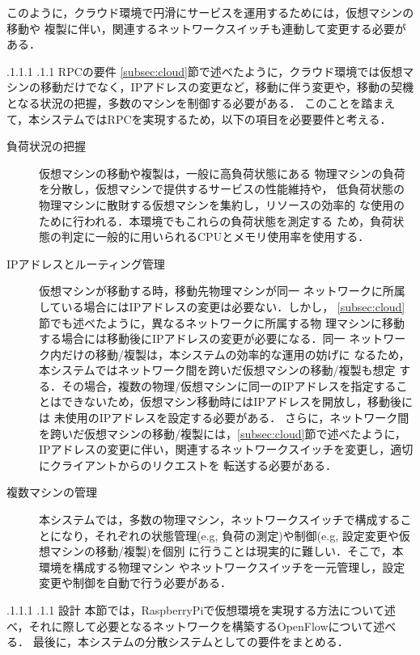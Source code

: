 \documentclass[a4paper, twocolumn]{jarticle}
\makeatletter
\def\section{\@startsection{section}{1}{\z@}%
 {.1\Cvs \@plus.1\Cdp \@minus.1\Cdp}%
 {.1\Cvs \@plus.1\Cdp}%
 {\normalfont\normalsize\bfseries}}
\def\subsection{\@startsection{subsection}{1}{\z@}%
 {.1\Cvs \@plus.1\Cdp \@minus.1\Cdp}%
 {.1\Cvs \@plus.1\Cdp}%
 {\normalfont\normalsize\bfseries}}
\makeatother
\begin{document}
このように，クラウド環境で円滑にサービスを運用するためには，仮想マシンの移動や
複製に伴い，関連するネットワークスイッチも連動して変更する必要がある．

\subsection{RPCの要件}\label{subsec:requirement}
\ref{subsec:cloud}節で述べたように，クラウド環境では仮想マシンの移動だけでなく，IPアドレスの変更など，移動に伴う変更や，移動の契機となる状況の把握，多数のマシンを制御する必要がある．
このことを踏まえて，本システムではRPCを実現するため，以下の項目を必要要件と考える．

\begin{description}
\item [負荷状況の把握]仮想マシンの移動や複製は，一般に高負荷状態にある
  物理マシンの負荷を分散し，仮想マシンで提供するサービスの性能維持や，
  低負荷状態の物理マシンに散財する仮想マシンを集約し，リソースの効率的
  な使用のために行われる．本環境でもこれらの負荷状態を測定する
  ため，負荷状態の判定に一般的に用いられるCPUとメモリ使用率を使用する．

\item [IPアドレスとルーティング管理]仮想マシンが移動する時，移動先物理マシンが同一
  ネットワークに所属している場合にはIPアドレスの変更は必要ない．しかし，
  \ref{subsec:cloud}節でも述べたように，異なるネットワークに所属する物
  理マシンに移動する場合には移動後にIPアドレスの変更が必要になる．同一
  ネットワーク内だけの移動/複製は，本システムの効率的な運用の妨げに
  なるため，本システムではネットワーク間を跨いだ仮想マシンの移動/複製も想定
  する．その場合，複数の物理/仮想マシンに同一のIPアドレスを指定するこ
  とはできないため，仮想マシン移動時にはIPアドレスを開放し，移動後には
  未使用のIPアドレスを設定する必要がある．
  さらに，ネットワーク間を跨いだ仮想マシンの移動/複製には，\ref{subsec:cloud}節で述べたように，
  IPアドレスの変更に伴い，関連するネットワークスイッチを変更し，適切にクライアントからのリクエストを 転送する必要がある．

\item [複数マシンの管理]本システムでは，多数の物理マシン，ネットワークスイッチで構成することになり，それぞれの状態管理(e.g, 負荷の測定)や制御(e.g, 設定変更や仮想マシンの移動/複製)を個別
  に行うことは現実的に難しい．そこで，本環境を構成する物理マシン
  やネットワークスイッチを一元管理し，設定変更や制御を自動で行う必要がある．
\end{description}

\section{設計}
本節では，RaspberryPiで仮想環境を実現する方法について述べ，それに際して必要となるネットワークを構築するOpenFlowについて述べる．
最後に，本システムの分散システムとしての要件をまとめる．
\end{document}
